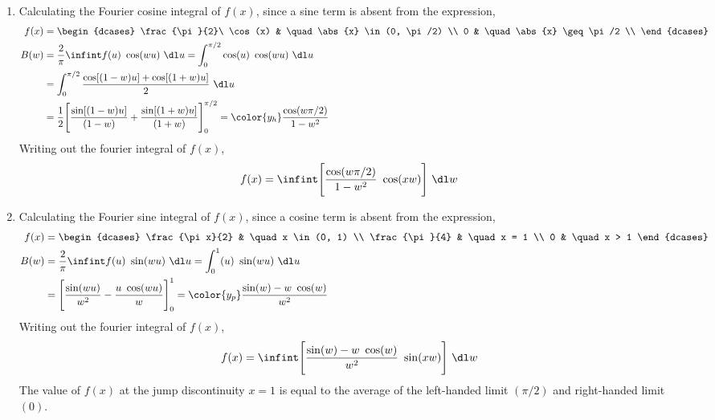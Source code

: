 \begin{enumerate}
    \item Calculating the Fourier cosine integral of $ f(x) $, since a sine term is
          absent from the expression,
          \begin{align}
              f(x) & = \begin{dcases}
                           \frac{\pi}{2}\ \cos(x) & \quad \abs{x} \in (0, \pi/2) \\
                           0                      & \quad \abs{x} \geq \pi/2     \\
                       \end{dcases}  \\
              B(w) & = \frac{2}{\pi} \infint f(u)\ \cos(wu)\ \dl u
              = \int_{0}^{\pi/2} \cos(u)\ \cos(wu)\ \dl u                     \\
                   & = \int_{0}^{\pi/2} \frac{\cos[(1-w)u] + \cos[(1+w)u]}{2}
              \ \dl u                                                         \\
                   & = \frac{1}{2}\Bigg[ \frac{\sin[(1-w)u]}{(1-w)}
                  + \frac{\sin[(1+w)u]}{(1 + w)}  \Bigg]_0^{\pi/2}
              = \color{y_h} \frac{\cos(w\pi/2)}{1 - w^2}
          \end{align}
          Writing out the fourier integral of $ f(x) $,
          \begin{align}
              f(x) & = \infint \Bigg[ \frac{\cos(w\pi/2)}{1 - w^2}\ \cos(xw)
                  \Bigg]\ \dl w
          \end{align}

    \item Calculating the Fourier sine integral of $ f(x) $, since a cosine term is
          absent from the expression,
          \begin{align}
              f(x) & = \begin{dcases}
                           \frac{\pi x}{2} & \quad x \in (0, 1) \\
                           \frac{\pi}{4}   & \quad x = 1        \\
                           0               & \quad x > 1
                       \end{dcases}                           \\
              B(w) & = \frac{2}{\pi} \infint f(u)\ \sin(wu)\ \dl u
              = \int_{0}^{1} (u)\ \sin(wu)\ \dl u                                     \\
                   & = \Bigg[ \frac{\sin(wu)}{w^2} - \frac{u\ \cos(wu)}{w} \Bigg]_0^1
              = \color{y_p} \frac{\sin(w) - w\ \cos(w)}{w^2}
          \end{align}
          Writing out the fourier integral of $ f(x) $,
          \begin{align}
              f(x) & = \infint \Bigg[ \frac{\sin(w) - w\ \cos(w)}{w^2}\ \sin(xw)
                  \Bigg]\ \dl w
          \end{align}
          The value of $ f(x) $ at the jump discontinuity $ x = 1 $ is equal to the
          average of the left-handed limit $ (\pi/2) $ and right-handed limit $ (0) $.


\end{enumerate}
